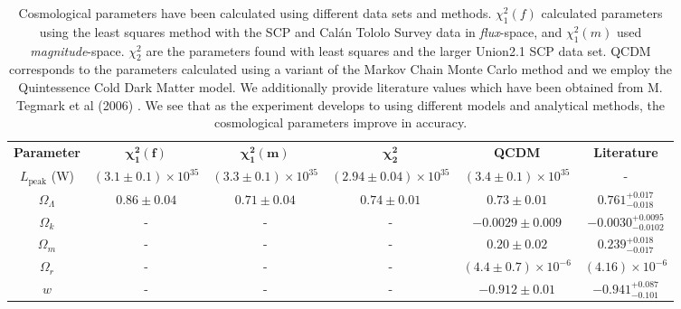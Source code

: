 \documentclass[twocolumn]{revtex4}
\begin{document}
{\renewcommand{\arraystretch}{1.2}%
\begin{table}[t]
\centering
\begin{tabular}{c@{\hskip 15pt}c@{\hskip 15pt}c@{\hskip 15pt}c@{\hskip 15pt}c@{\hskip 15pt}c} 
 \hline
 \textbf{Parameter} & \textbf{$\boldsymbol{\chi^2_{1}(f)}$} & \textbf{$\boldsymbol{\chi^2_{1}(m)}$} & \textbf{$\boldsymbol{\chi^2_2}$} & \textbf{QCDM} & \textbf{Literature} \\ [0.5ex] 
 $L_{\text{peak}}$ (W) & $(3.1\pm0.1)\times 10^{35}$ & $(3.3\pm0.1)\times 10^{35}$ & $(2.94\pm0.04)\times 10^{35}$ & $(3.4\pm0.1 ) \times 10^{35}$ & -\\
 $\Omega_\Lambda$ & $0.86\pm0.04$ &  $0.71\pm0.04$ & $0.74\pm0.01$ & $0.73\pm0.01$ & $0.761^{+0.017}_{-0.018}$ \\
 $\Omega_k$ & - & - & - & $-0.0029\pm0.009$ & $-0.0030^{+0.0095}_{-0.0102}$ \\
 $\Omega_m$ & - & - & - & $0.20\pm0.02$ & $0.239^{+0.018}_{-0.017}$ \\
 $\Omega_r$ & - & - & - & $(4.4\pm0.7)\times10^{-6}$ & $(4.16)\times10^{-6}$ \\
 $w$ & - & - & - & $-0.912\pm0.01$ & $-0.941^{+0.087}_{-0.101}$ \\
 \hline
\end{tabular}
\caption{Cosmological parameters have been calculated using different data sets and methods. $\chi^2_1(f)$ calculated parameters using the least squares method with the SCP and Cal\'{a}n Tololo Survey data in \textit{flux}-space, and $\chi^2_1(m)$ used \textit{magnitude}-space. $\chi^2_2$ are the parameters found with least squares and the larger Union2.1 SCP data set. QCDM corresponds to the parameters calculated using a variant of the Markov Chain Monte Carlo method and we employ the Quintessence Cold Dark Matter model. We additionally provide literature values which have been obtained from M. Tegmark et al (2006) \cite{cosmo_constraints}. We see that as the experiment develops to using different models and analytical methods, the cosmological parameters improve in accuracy.}
\vspace{-0.5em}
\label{table:cosmo_parameters}
\end{table}

}
\end{document}
